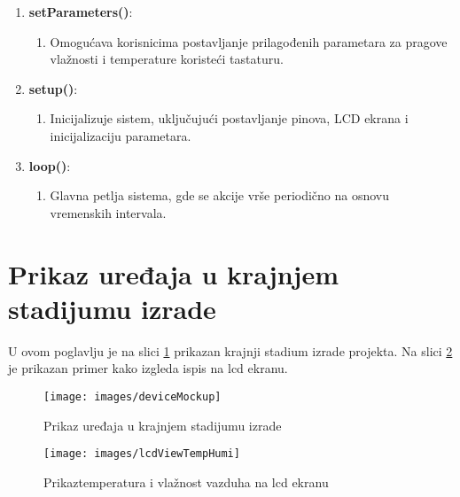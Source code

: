 \documentclass[a4paper, 12pt]{article}
\begin{document}
\begin{enumerate}[label=\arabic*.,leftmargin=*]
    \item \textbf{setParameters()}:
        \begin{enumerate}[label={},leftmargin=*] 
            \item Omogućava korisnicima postavljanje prilagođenih parametara za pragove vlažnosti i temperature koristeći tastaturu.
        \end{enumerate}
        
    \item \textbf{setup()}:
        \begin{enumerate}[label={},leftmargin=*]
        		\sloppypar
            \item Inicijalizuje sistem, uključujući postavljanje pinova, LCD ekrana i inicijalizaciju parametara.
        \end{enumerate}
        
    \item \textbf{loop()}:
        \begin{enumerate}[label={},leftmargin=*] 
            \item Glavna petlja sistema, gde se akcije vrše periodično na osnovu vremenskih intervala.
        \end{enumerate}
\end{enumerate}

\pagebreak
\endgroup

\begingroup
\justifying
\section{Prikaz uređaja u krajnjem stadijumu izrade}

\vspace{10pt}

U ovom poglavlju je na slici \ref{fig:deviceMockup} prikazan krajnji stadium izrade projekta. Na slici \ref{fig:lcdViewTempHumi} je prikazan primer kako izgleda ispis na lcd ekranu.

\vspace{10pt}

\begin{figure}[H]
\centering
\texttt{[image: images/deviceMockup]}
\caption{Prikaz uređaja u krajnjem stadijumu izrade}\label{fig:deviceMockup}
\end{figure}

\vspace{10pt}

\begin{figure}[H]
\centering
\texttt{[image: images/lcdViewTempHumi]}
\caption{Prikaztemperatura i vlažnost vazduha na  lcd ekranu}\label{fig:lcdViewTempHumi}
\end{figure}
\end{document}
